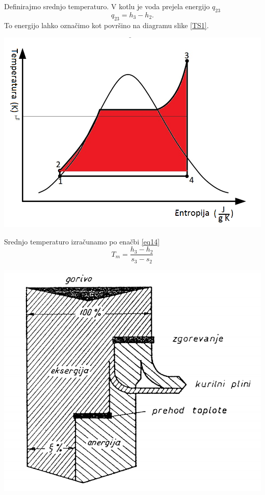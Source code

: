 \documentclass[a4paper,10pt]{article}
\begin{document}
\begin{multicols}{2}
Definirajmo srednjo temperaturo. V kotlu je voda prejela energijo $q_{23}$
\begin{equation}
	q_{23}= h_3-h_2.
\end{equation}
To energijo lahko označimo kot površino na diagramu slike \ref{TS1}. 
\begin{minipage}{\linewidth}
	\includegraphics[width=0.95\columnwidth]{Untitled2.png}
	\label{TS1}
\end{minipage}
Srednjo temperaturo izračunamo po enačbi \ref{eq14}
\begin{equation}
	T_m=\frac{h_3-h_2}{s_3-s_2}
	\label{eq14}
\end{equation}
\begin{minipage}{\linewidth}
	\includegraphics[width=\columnwidth]{Tokenergij.png}
	\label{kot2}
\end{minipage}

\end{multicols}
\end{document}
